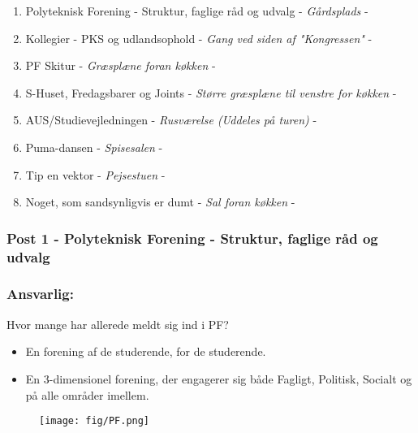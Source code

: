 \begin{enumerate}
 \item Polyteknisk Forening - Struktur, faglige råd og udvalg - \textit{Gårdsplads} - \clint
 \item Kollegier - PKS og udlandsophold - \textit{Gang ved siden af "Kongressen"} - \karla
 \item PF Skitur - \textit{Græsplæne foran køkken} - \buddha
 \item S-Huset, Fredagsbarer og Joints - \textit{Større græsplæne til venstre for køkken} - \hemorides
 \item AUS/Studievejledningen - \textit{Rusværelse (Uddeles på turen)} - \mighty
 \item Puma-dansen - \textit{Spisesalen} - \randildo
 \item Tip en vektor - \textit{Pejsestuen} - \farav
 \item Noget, som sandsynligvis er dumt - \textit{Sal foran køkken} - 
\end{enumerate}


\subsubsection*{\textbf{Post 1 - Polyteknisk Forening - Struktur, faglige råd og udvalg}}
\subsubsection*{\textbf{Ansvarlig:} \Clint}

Hvor mange har allerede meldt sig ind i PF? 

\begin{itemize}
 \item En forening af de studerende, for de studerende.
 \item En 3-dimensionel forening, der engagerer sig både Fagligt, Politisk, Socialt og på alle områder imellem.
\end{itemize}

\begin{figure}[H]
\centering
\texttt{[image: fig/PF.png]}
\end{figure}

